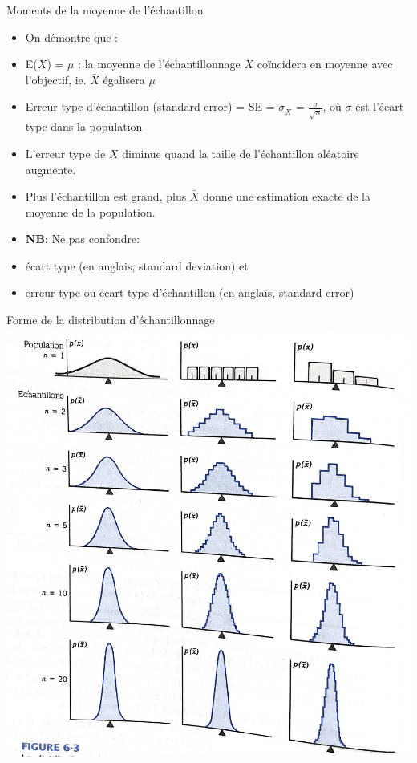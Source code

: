 \documentclass[
  ignorenonframetext,
]{beamer}
\begin{document}
\begin{frame}{Moments de la moyenne de l'échantillon}
\protect\hypertarget{moments-de-la-moyenne-de-luxe9chantillon}{}
\begin{itemize}
\item
  On démontre que :
\item
  E(\(\bar{X}\)) = \(\mu\) : la moyenne de l'échantillonnage \(\bar{X}\)
  coïncidera en moyenne avec l'objectif, ie. \(\bar{X}\) égalisera
  \(\mu\)
\item
  Erreur type d'échantillon (standard error) = SE = \(\sigma_{\bar{X}}\)
  = \(\frac{\sigma}{\sqrt{n}}\), où \(\sigma\) est l'écart type dans la
  population
\item
  L'erreur type de \(\bar{X}\) diminue quand la taille de l'échantillon
  aléatoire augmente.
\item
  Plus l'échantillon est grand, plus \(\bar{X}\) donne une estimation
  exacte de la moyenne de la population.
\item
  \textbf{NB}: Ne pas confondre:
\item
  écart type (en anglais, standard deviation) et
\item
  erreur type ou écart type d'échantillon (en anglais, standard error)
\end{itemize}
\end{frame}

\begin{frame}{Forme de la distribution d'échantillonnage}
\protect\hypertarget{forme-de-la-distribution-duxe9chantillonnage}{}
\includegraphics{../Images/distribution_echantillonnage.jpg}
\end{frame}
\end{document}
